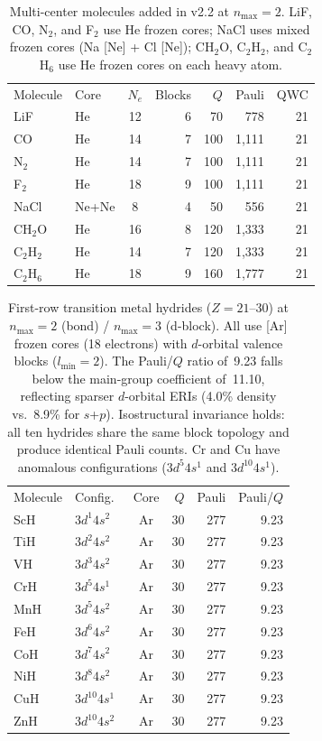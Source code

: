\documentclass[twocolumn,pra,amsmath,amssymb,superscriptaddress]{revtex4-2}
\begin{document}
\begin{table}[h]
\caption{Multi-center molecules added in v2.2 at $n_{\max}=2$.
  LiF, CO, N$_2$, and F$_2$ use He frozen cores; NaCl uses mixed
  frozen cores (Na [Ne] + Cl [Ne]); CH$_2$O, C$_2$H$_2$, and
  C$_2$H$_6$ use He frozen cores on each heavy atom.}
\label{tab:multicenter}
\begin{ruledtabular}
\begin{tabular}{llcrrrr}
Molecule & Core & $N_e$ & Blocks & $Q$ & Pauli & QWC \\
\colrule
LiF      & He   & 12 & 6 &  70 &    778 & 21 \\
CO       & He   & 14 & 7 & 100 & 1{,}111 & 21 \\
N$_2$    & He   & 14 & 7 & 100 & 1{,}111 & 21 \\
F$_2$    & He   & 18 & 9 & 100 & 1{,}111 & 21 \\
NaCl     & Ne+Ne & 8 & 4 &  50 &    556 & 21 \\
CH$_2$O  & He   & 16 & 8 & 120 & 1{,}333 & 21 \\
C$_2$H$_2$ & He & 14 & 7 & 120 & 1{,}333 & 21 \\
C$_2$H$_6$ & He & 18 & 9 & 160 & 1{,}777 & 21 \\
\end{tabular}
\end{ruledtabular}
\end{table}

\begin{table}[h]
\caption{First-row transition metal hydrides ($Z = 21$--30) at $n_{\max}=2$
  (bond) / $n_{\max}=3$ (d-block).
  All use [Ar] frozen cores (18 electrons) with $d$-orbital valence
  blocks ($l_{\min} = 2$).  The Pauli/$Q$ ratio of~9.23
  falls below the main-group coefficient of~11.10, reflecting
  sparser $d$-orbital ERIs (4.0\% density vs.\ 8.9\% for $s$+$p$).
  Isostructural invariance holds: all ten hydrides share the same
  block topology and produce identical Pauli counts.
  Cr and Cu have anomalous configurations ($3d^5 4s^1$ and $3d^{10} 4s^1$).}
\label{tab:transition_metals}
\begin{ruledtabular}
\begin{tabular}{llcrrr}
Molecule & Config.\ & Core & $Q$ & Pauli & Pauli/$Q$ \\
\colrule
ScH & $3d^1 4s^2$ & Ar & 30 & 277 & 9.23 \\
TiH & $3d^2 4s^2$ & Ar & 30 & 277 & 9.23 \\
VH  & $3d^3 4s^2$ & Ar & 30 & 277 & 9.23 \\
CrH & $3d^5 4s^1$ & Ar & 30 & 277 & 9.23 \\
MnH & $3d^5 4s^2$ & Ar & 30 & 277 & 9.23 \\
FeH & $3d^6 4s^2$ & Ar & 30 & 277 & 9.23 \\
CoH & $3d^7 4s^2$ & Ar & 30 & 277 & 9.23 \\
NiH & $3d^8 4s^2$ & Ar & 30 & 277 & 9.23 \\
CuH & $3d^{10} 4s^1$ & Ar & 30 & 277 & 9.23 \\
ZnH & $3d^{10} 4s^2$ & Ar & 30 & 277 & 9.23 \\
\end{tabular}
\end{ruledtabular}
\end{table}
\end{document}
